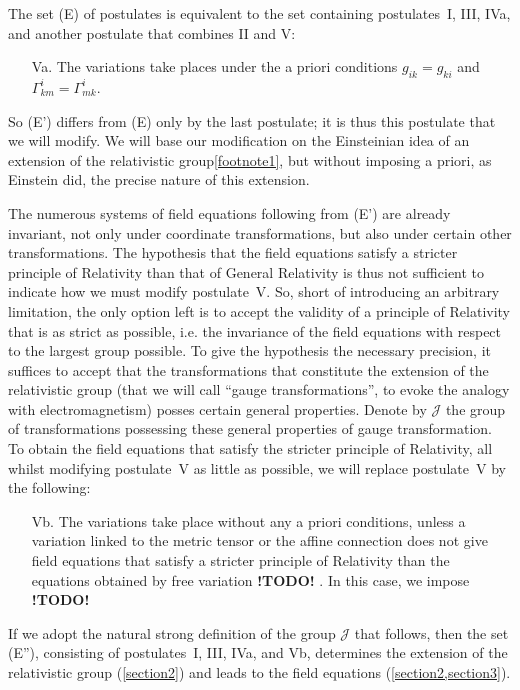 \documentclass{article}
\newcommand{\JJ}{\mathcal{J}}
\newcommand{\todo}{\textbf{ !TODO! }}
\newcommand{\oldpage}[1]{\marginpar{\footnotesize$\Big\vert$ \textit{p.~#1}}}
\begin{document}
The set (E) of postulates is equivalent to the set containing postulates~I, III, IVa, and another postulate that combines II and V:
\begin{enumerate}
  \item[Va.] The variations take places under the a priori conditions $g_{ik}=g_{ki}$ and $\Gamma_{km}^i=\Gamma_{mk}^i$.
\end{enumerate}

So (E') differs from (E) only by the last postulate; it is thus this postulate that we will modify.
We will base our modification on the Einsteinian idea of an extension of the relativistic group\cref{footnote1}, but without imposing a priori, as Einstein did, the precise nature of this extension.

The numerous systems of field equations following from (E') are already invariant, not only under coordinate transformations, but also under certain other transformations.
The hypothesis that the field equations satisfy a stricter principle of Relativity than that of General Relativity is thus not sufficient to indicate how we must modify postulate~V.
So, short of introducing an arbitrary limitation, the only option left is to accept the validity of a principle of Relativity
\oldpage{10-03}
that is as strict as possible, i.e. the invariance of the field equations with respect to the largest group possible.
To give the hypothesis the necessary precision, it suffices to accept that the transformations that constitute the extension of the relativistic group (that we will call ``gauge transformations'', to evoke the analogy with electromagnetism) posses certain general properties.
Denote by $\JJ$ the group of transformations possessing these general properties of gauge transformation.
To obtain the field equations that satisfy the stricter principle of Relativity, all whilst modifying postulate~V as little as possible, we will replace postulate~V by the following:
\begin{enumerate}
  \item[Vb.] The variations take place without any a priori conditions, unless a variation linked to the metric tensor or the affine connection does not give field equations that satisfy a stricter principle of Relativity than the equations obtained by free variation\todo.
    In this case, we impose \todo
\end{enumerate}

If we adopt the natural strong definition of the group $\JJ$ that follows, then the set (E''), consisting of postulates~I, III, IVa, and Vb, determines the extension of the relativistic group (\cref{section2}) and leads to the field equations (\cref{section2,section3}).
\end{document}
